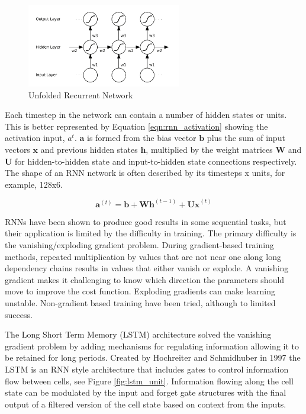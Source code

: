 \documentclass[sensors,article,submit,moreauthors,pdftex]{Definitions/mdpi}
\begin{document}
\begin{figure}[!hbt]
    \centering
    \includegraphics[width=0.6\textwidth]{Figures/lstm/rnn_structure.png}
    \caption{Unfolded Recurrent Network \cite{Graves2012}}
    \label{fig:rnn_structure}
\end{figure}

Each timestep in the network can contain a number of hidden states or units. This is better represented by Equation \ref{eqn:rnn_activation} showing the activation input, $a^t$. $\mathbf{a}$ is formed from the bias vector $\mathbf{b}$ plus the sum of input vectors $\mathbf{x}$ and previous hidden states $\mathbf{h}$, multiplied by the weight matrices $\mathbf{W}$ and $\mathbf{U}$ for hidden-to-hidden state and input-to-hidden state connections respectively.\cite{Goodfellow2015} The shape of an RNN network is often described by its timesteps x units, for example, 128x6.

\begin{equation}
    \mathbf{a}^{(t)} = \mathbf{b} + \mathbf{Wh}^{(t-1)} + \mathbf{Ux}^{(t)}
    \label{eqn:rnn_activation}
\end{equation}

RNNs have been shown to produce good results in some sequential tasks, but their application is limited by the difficulty in training. The primary difficulty is the vanishing/exploding gradient problem. During gradient-based training methods, repeated multiplication by values that are not near one along long dependency chains results in values that either vanish or explode. A vanishing gradient makes it challenging to know which direction the parameters should move to improve the cost function. Exploding gradients can make learning unstable. Non-gradient based training have been tried, although to limited success. \cite{Graves2012, Goodfellow2015}

The Long Short Term Memory (LSTM) architecture solved the vanishing gradient problem by adding mechanisms for regulating information allowing it to be retained for long periods. Created by Hochreiter and Schmidhuber in 1997\cite{Hochreiter1997} the LSTM is an RNN style architecture that includes gates to control information flow between cells, see Figure \ref{fig:lstm_unit}. Information flowing along the cell state can be modulated by the input and forget gate structures with the final output of a filtered version of the cell state based on context from the inputs.\cite{Olah2015}
\end{document}

